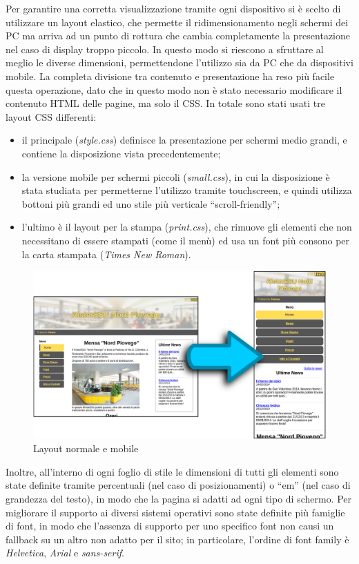\documentclass[10pt,a4paper,onecolumn]{article}
\begin{document}
Per garantire una corretta visualizzazione tramite ogni dispositivo si è scelto di utilizzare un layout elastico, che permette il ridimensionamento negli schermi dei PC ma arriva ad un punto di rottura che cambia completamente la presentazione nel caso di display troppo piccolo. In questo modo si riescono a sfruttare al meglio le diverse dimensioni, permettendone l'utilizzo sia da PC che da dispositivi mobile.
La completa divisione tra contenuto e presentazione ha reso più facile questa operazione, dato che in questo modo non è stato necessario modificare il contenuto HTML delle pagine, ma solo il CSS.
In totale sono stati usati tre layout CSS differenti:
\begin{itemize}
 \item il principale (\textit{style.css}) definisce la presentazione per schermi medio grandi, e contiene la disposizione vista precedentemente;
 \item la versione mobile per schermi piccoli (\textit{small.css}), in cui la disposizione è stata studiata per permetterne l'utilizzo tramite touchscreen, e quindi utilizza  bottoni più grandi ed uno stile più verticale ``scroll-friendly'';
 \item l'ultimo è il layout per la stampa (\textit{print.css}), che rimuove gli elementi che non necessitano di essere stampati (come il menù) ed usa un font più consono per la carta stampata (\textit{Times New Roman}).
\end{itemize}

\begin{figure}[h]
\centering
\includegraphics[scale=0.20]{trasformazione}
\caption{Layout normale e mobile}
\label{trasformazioneMobile}
\end{figure}

Inoltre, all'interno di ogni foglio di stile le dimensioni di tutti gli elementi sono state definite tramite percentuali (nel caso di posizionamenti) o ``em'' (nel caso di grandezza del testo), in modo che la pagina si adatti ad ogni tipo di schermo.
Per migliorare il supporto ai diversi sistemi operativi sono state definite più famiglie di font, in modo che l'assenza di supporto per uno specifico font non causi un fallback su un altro non adatto per il sito; in particolare, l'ordine di font family è \textit{Helvetica}, \textit{Arial} e \textit{sans-serif}.
\end{document}
